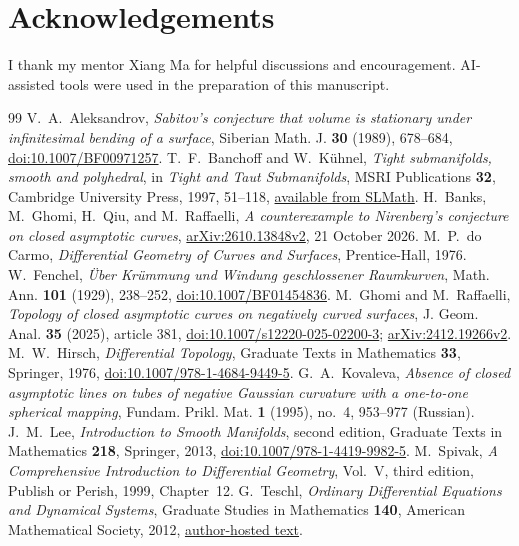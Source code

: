 \documentclass[11pt]{amsart}
\theoremstyle{definition}
\begin{document}
\section*{Acknowledgements}
I thank my mentor Xiang Ma for helpful discussions and encouragement.
AI-assisted tools were used in the preparation of this manuscript.

\begin{thebibliography}{99}
V.~A.~Aleksandrov,
\emph{Sabitov's conjecture that volume is stationary under infinitesimal
bending of a surface}, Siberian Math. J. \textbf{30} (1989), 678--684,
\href{https://doi.org/10.1007/BF00971257}{doi:10.1007/BF00971257}.
T.~F.~Banchoff and W.~K\"uhnel,
\emph{Tight submanifolds, smooth and polyhedral}, in
\emph{Tight and Taut Submanifolds}, MSRI Publications \textbf{32},
Cambridge University Press, 1997, 51--118,
\href{https://library.slmath.org/books/Book32/files/banchoff.pdf}{available from SLMath}.
H.~Banks, M.~Ghomi, H.~Qiu, and M.~Raffaelli,
\emph{A counterexample to Nirenberg's conjecture on closed asymptotic
curves}, \href{https://arxiv.org/abs/2610.13848v2}{arXiv:2610.13848v2},
21 October 2026.
M.~P.~do Carmo, \emph{Differential Geometry of Curves and Surfaces},
Prentice-Hall, 1976.
W.~Fenchel, \emph{\"Uber Kr\"ummung und Windung geschlossener Raumkurven},
Math. Ann. \textbf{101} (1929), 238--252,
\href{https://doi.org/10.1007/BF01454836}{doi:10.1007/BF01454836}.
M.~Ghomi and M.~Raffaelli,
\emph{Topology of closed asymptotic curves on negatively curved surfaces},
J. Geom. Anal. \textbf{35} (2025), article 381,
\href{https://doi.org/10.1007/s12220-025-02200-3}{doi:10.1007/s12220-025-02200-3};
\href{https://arxiv.org/abs/2412.19266v2}{arXiv:2412.19266v2}.
M.~W.~Hirsch, \emph{Differential Topology},
Graduate Texts in Mathematics \textbf{33}, Springer, 1976,
\href{https://doi.org/10.1007/978-1-4684-9449-5}{doi:10.1007/978-1-4684-9449-5}.
G.~A.~Kovaleva,
\emph{Absence of closed asymptotic lines on tubes of negative Gaussian
curvature with a one-to-one spherical mapping},
Fundam. Prikl. Mat. \textbf{1} (1995), no.~4, 953--977 (Russian).
J.~M.~Lee, \emph{Introduction to Smooth Manifolds}, second edition,
Graduate Texts in Mathematics \textbf{218}, Springer, 2013,
\href{https://doi.org/10.1007/978-1-4419-9982-5}{doi:10.1007/978-1-4419-9982-5}.
M.~Spivak, \emph{A Comprehensive Introduction to Differential Geometry},
Vol.~V, third edition, Publish or Perish, 1999, Chapter~12.
G.~Teschl, \emph{Ordinary Differential Equations and Dynamical Systems},
Graduate Studies in Mathematics \textbf{140}, American Mathematical
Society, 2012,
\href{https://www.mat.univie.ac.at/~gerald/ftp/book-ode/ode.pdf}{author-hosted text}.
\end{thebibliography}
\end{document}
